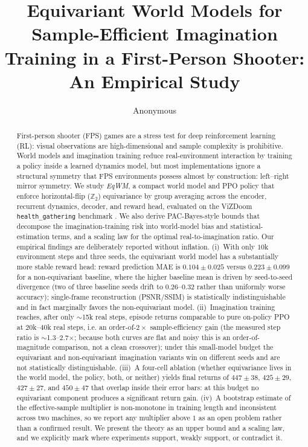 \documentclass[sigconf,anonymous]{acmart}
\begin{document}
\title{Equivariant World Models for Sample-Efficient Imagination\\
Training in a First-Person Shooter: An Empirical Study}

\author{Anonymous}

\begin{abstract}
First-person shooter (FPS) games are a stress test for deep reinforcement
learning (RL): visual observations are high-dimensional and sample
complexity is prohibitive. World models and imagination training
\cite{worldmodels2018,dreamerv3} reduce real-environment interaction by
training a policy inside a learned dynamics model, but most implementations
ignore a structural symmetry that FPS environments possess almost by
construction: left--right mirror symmetry. We study \emph{EqWM}, a compact
world model and PPO policy that enforce horizontal-flip ($\mathbb Z_2$)
equivariance by group averaging across the encoder, recurrent dynamics,
decoder, and reward head, evaluated on the ViZDoom \texttt{health\_gathering}
benchmark \cite{vizdoom2016}. We also derive PAC-Bayes-style bounds that
decompose the imagination-training risk into world-model bias and
statistical-estimation terms, and a scaling law for the optimal
real-to-imagination ratio. Our empirical findings are deliberately reported
without inflation. (i)~With only $10$k environment steps and three seeds, the
equivariant world model has a substantially more stable reward head: reward
prediction MAE is $0.104\pm0.025$ versus $0.223\pm0.099$ for a
non-equivariant baseline, where the higher baseline mean is driven by
seed-to-seed divergence (two of three baseline seeds drift to
$0.26$--$0.32$ rather than uniformly worse accuracy); single-frame
reconstruction (PSNR/SSIM) is statistically indistinguishable and in fact
marginally favors the non-equivariant model. (ii)~Imagination training
reaches, after only $\sim$15k real steps, episode returns comparable to pure
on-policy PPO at $20$k--$40$k real steps, i.e. an order-of-$2\times$
sample-efficiency gain (the measured step ratio is $\sim$1.3--2.7$\times$;
because both curves are flat and noisy this is an order-of-magnitude
comparison, not a clean crossover); under this small-model budget the
equivariant and non-equivariant imagination variants win on different seeds
and are not statistically distinguishable. (iii)~A four-cell ablation
(whether equivariance lives in the world model, the policy, both, or
neither) yields final returns of $447\pm38$, $425\pm29$, $427\pm27$, and
$450\pm47$ that overlap inside their error bars: at this budget no
equivariant component produces a significant return gain. (iv)~A bootstrap
estimate of the effective-sample multiplier is non-monotone in training
length and inconsistent across two machines, so we report any multiplier
above $1$ as an open problem rather than a confirmed result. We
present the theory as an upper bound and a scaling law, and we explicitly
mark where experiments support, weakly support, or contradict it.
\end{abstract}
\end{document}
